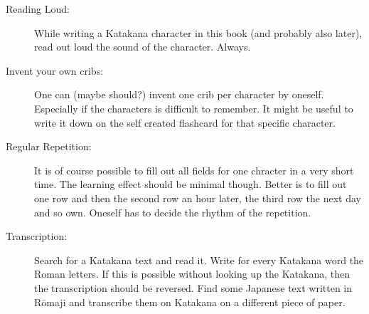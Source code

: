 \begin{description}

\item[Reading Loud:] While writing a Katakana character in this book (and
probably also later), read out loud the sound of the character. Always. 

\item[Invent your own cribs:] One can (maybe should?) invent one crib per
character by oneself. Especially if the characters is difficult to remember. It
might be useful to write it down on the self created flashcard for that
specific character.

\item[Regular Repetition:] It is of course possible to fill out all fields
for one chracter in a very short time. The learning effect should be minimal
though. Better is to fill out one row and then the second row an hour later,
the third row the next day and so own. Oneself has to decide the rhythm of
the repetition. 

\item[Transcription:]  Search for a  Katakana text and read it. Write for every
Katakana word the Roman letters. If this is possible without looking up the
Katakana, then the transcription should be reversed. Find some Japanese text
written in Rōmaji and transcribe them on Katakana on a different piece of
paper. 

\end{description}

\newpage








